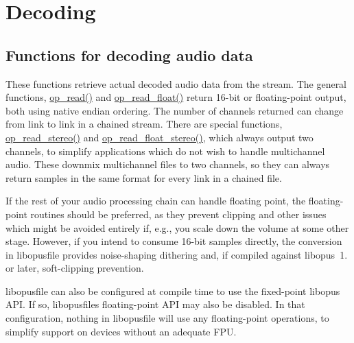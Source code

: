 \hypertarget{group__stream__decoding}{}\section{Decoding}
\label{group__stream__decoding}
\subsection*{Functions for decoding audio data}
\label{_amgrp226a9332d44ee54e9c863d78e0829f0d}%
These functions retrieve actual decoded audio data from the stream. The general functions, \hyperlink{group__stream__decoding_ga963c917749335e29bb2b698c1cb20a10}{op\+\_\+read()} and \hyperlink{group__stream__decoding_ga73493002d84a234f5e19b70f1dddbe2a}{op\+\_\+read\+\_\+float()} return 16-\/bit or floating-\/point output, both using native endian ordering. The number of channels returned can change from link to link in a chained stream. There are special functions, \hyperlink{group__stream__decoding_gaaca17ad3fd6430dc8fd43308149428eb}{op\+\_\+read\+\_\+stereo()} and \hyperlink{group__stream__decoding_ga9736f96563500c0978f56f0fd6bdad83}{op\+\_\+read\+\_\+float\+\_\+stereo()}, which always output two channels, to simplify applications which do not wish to handle multichannel audio. These downmix multichannel files to two channels, so they can always return samples in the same format for every link in a chained file.

If the rest of your audio processing chain can handle floating point, the floating-\/point routines should be preferred, as they prevent clipping and other issues which might be avoided entirely if, e.\+g., you scale down the volume at some other stage. However, if you intend to consume 16-\/bit samples directly, the conversion in {\ttfamily libopusfile} provides noise-\/shaping dithering and, if compiled against {\ttfamily libopus}~1. or later, soft-\/clipping prevention.

{\ttfamily libopusfile} can also be configured at compile time to use the fixed-\/point {\ttfamily libopus} A\+PI. If so, {\ttfamily libopusfile}\textquotesingle{}s floating-\/point A\+PI may also be disabled. In that configuration, nothing in {\ttfamily libopusfile} will use any floating-\/point operations, to simplify support on devices without an adequate F\+PU.

